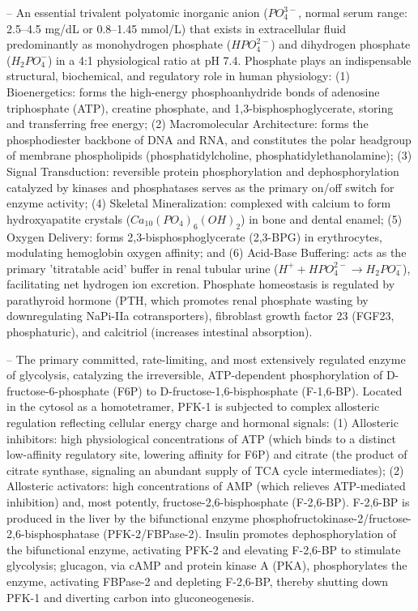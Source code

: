 -- An essential trivalent polyatomic inorganic anion ($PO_4^{3-}$, normal serum range: 2.5--4.5 mg/dL or 0.8--1.45 mmol/L) that exists in extracellular fluid predominantly as monohydrogen phosphate ($HPO_4^{2-}$) and dihydrogen phosphate ($H_2PO_4^-$) in a 4:1 physiological ratio at pH 7.4. Phosphate plays an indispensable structural, biochemical, and regulatory role in human physiology: (1) Bioenergetics: forms the high-energy phosphoanhydride bonds of adenosine triphosphate (ATP), creatine phosphate, and 1,3-bisphosphoglycerate, storing and transferring free energy; (2) Macromolecular Architecture: forms the phosphodiester backbone of DNA and RNA, and constitutes the polar headgroup of membrane phospholipids (phosphatidylcholine, phosphatidylethanolamine); (3) Signal Transduction: reversible protein phosphorylation and dephosphorylation catalyzed by kinases and phosphatases serves as the primary on/off switch for enzyme activity; (4) Skeletal Mineralization: complexed with calcium to form hydroxyapatite crystals ($Ca_{10}(PO_4)_6(OH)_2$) in bone and dental enamel; (5) Oxygen Delivery: forms 2,3-bisphosphoglycerate (2,3-BPG) in erythrocytes, modulating hemoglobin oxygen affinity; and (6) Acid-Base Buffering: acts as the primary 'titratable acid' buffer in renal tubular urine ($H^+ + HPO_4^{2-} \to H_2PO_4^-$), facilitating net hydrogen ion excretion. Phosphate homeostasis is regulated by parathyroid hormone (PTH, which promotes renal phosphate wasting by downregulating NaPi-IIa cotransporters), fibroblast growth factor 23 (FGF23, phosphaturic), and calcitriol (increases intestinal absorption).

-- The primary committed, rate-limiting, and most extensively regulated enzyme of glycolysis, catalyzing the irreversible, ATP-dependent phosphorylation of D-fructose-6-phosphate (F6P) to D-fructose-1,6-bisphosphate (F-1,6-BP). Located in the cytosol as a homotetramer, PFK-1 is subjected to complex allosteric regulation reflecting cellular energy charge and hormonal signals: (1) Allosteric inhibitors: high physiological concentrations of ATP (which binds to a distinct low-affinity regulatory site, lowering affinity for F6P) and citrate (the product of citrate synthase, signaling an abundant supply of TCA cycle intermediates); (2) Allosteric activators: high concentrations of AMP (which relieves ATP-mediated inhibition) and, most potently, fructose-2,6-bisphosphate (F-2,6-BP). F-2,6-BP is produced in the liver by the bifunctional enzyme phosphofructokinase-2/fructose-2,6-bisphosphatase (PFK-2/FBPase-2). Insulin promotes dephosphorylation of the bifunctional enzyme, activating PFK-2 and elevating F-2,6-BP to stimulate glycolysis; glucagon, via cAMP and protein kinase A (PKA), phosphorylates the enzyme, activating FBPase-2 and depleting F-2,6-BP, thereby shutting down PFK-1 and diverting carbon into gluconeogenesis.

